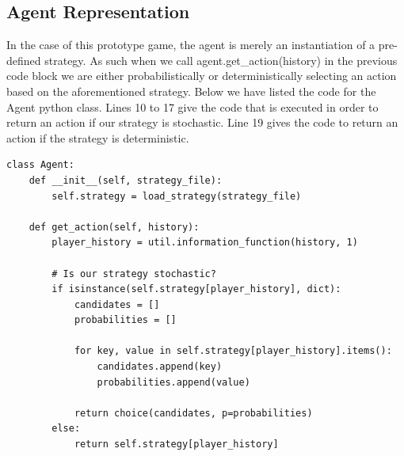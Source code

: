\subsection{Agent Representation}\label{subsec:agent}
In the case of this prototype game, the agent is merely an instantiation of a pre-defined strategy.
As such when we call agent.get\_action(history) in the previous code block we are either probabilistically
or deterministically selecting an action based on the aforementioned strategy.
Below we have listed the code for the Agent python class.
Lines 10 to 17 give the code that is executed in order to return an action if our strategy is stochastic.
Line 19 gives the code to return an action if the strategy is deterministic.

\begin{lstlisting}[style=Python]
class Agent:
    def __init__(self, strategy_file):
        self.strategy = load_strategy(strategy_file)

    def get_action(self, history):
        player_history = util.information_function(history, 1)

        # Is our strategy stochastic?
        if isinstance(self.strategy[player_history], dict):
            candidates = []
            probabilities = []

            for key, value in self.strategy[player_history].items():
                candidates.append(key)
                probabilities.append(value)

            return choice(candidates, p=probabilities)
        else:
            return self.strategy[player_history]
\end{lstlisting}

